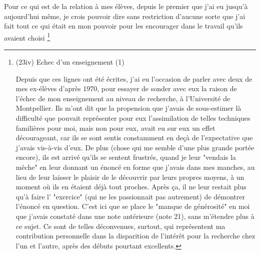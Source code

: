 Pour ce qui est de la relation à mes élèves, depuis le premier que j'ai eu jusqu'à aujourd'hui même, je crois pouvoir dire sans restriction d'aucune sorte que j'ai fait tout ce qui était en mon pouvoir pour les encourager dans le travail qu'ils avaient choisi \footnote{(23iv) Echec d'un enseignement (1) \par Depuis que ces lignes ont été écrites, j'ai eu l'occasion de parler avec deux de mes ex-élèves d'après 1970, pour essayer de sonder avec eux la raison de l'échec de mon enseignement au niveau de recherche, à l'Université de Montpellier. Ils m'ont dit que la propension que j'avais de sous-estimer là difficulté que pouvait représenter pour eux l'assimilation de telles techniques familières pour moi, mais non pour eux, avait eu sur eux un effet décourageant, car ils se sont sentis constamment en deçà de l'expectative que j'avais vis-à-vis d'eux. De plus (chose qui me semble d'une plus grande portée encore), ils est arrivé qu'ils se sentent frustrés, quand je leur "vendais la mèche" en leur donnant un énoncé en forme que j'avais dans mes manches, au lieu de leur laisser le plaisir de le découvrir par leurs propres moyens, à un moment où ils en étaient déjà tout proches. Après ça, il ne leur restait plus qu'à faire l' "exercice" (qui ne les passionnait pas autrement) de démontrer l'énoncé en question. C'est ici que se place le "manque de générosité" en moi que j'avais constaté dans une note antérieure (note 21), sans m'étendre plus à ce sujet. Ce sont de telles déconvenues, surtout, qui représentent ma contribution personnelle dans la disparition de l'intérêt pour la recherche chez l'un et l'autre, après des débuts pourtant excellents. 

}
